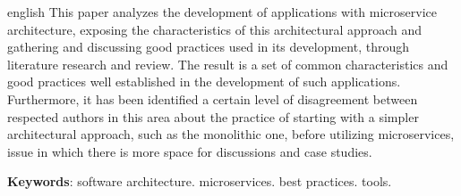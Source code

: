 \setlength{\absparsep}{18pt} %
\begin{resumo}[Abstract]
 \begin{otherlanguage*}{english}
   This paper analyzes the development of applications with microservice architecture, exposing the characteristics of this architectural approach and gathering and discussing good practices used in its development, through literature research and review. The result is a set of common characteristics and good practices well established in the development of such applications. Furthermore, it has been identified a certain level of disagreement between respected authors in this area about the practice of starting with a simpler architectural approach, such as the monolithic one, before utilizing microservices, issue in which there is more space for discussions and case studies.

   \vspace{\onelineskip}
 
   \noindent 
   \textbf{Keywords}: software architecture. microservices. best practices. tools.
 \end{otherlanguage*}
\end{resumo}